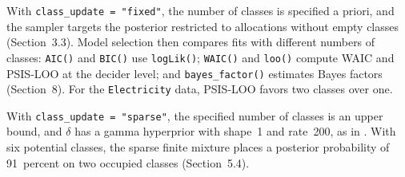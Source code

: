 \documentclass[12pt,a4paper]{article}
\begin{document}
\begin{enumerate}
    With \texttt{class\_update = "fixed"}, the number of classes is specified a
    priori, and the sampler targets the posterior restricted to allocations
    without empty classes (Section~3.3). Model selection then compares fits with
    different numbers of classes: \texttt{AIC()} and \texttt{BIC()} use
    \texttt{logLik()}; \texttt{WAIC()} and \texttt{loo()} compute WAIC and
    PSIS-LOO at the decider level; and \texttt{bayes\_factor()} estimates Bayes
    factors (Section~8). For the \texttt{Electricity} data, PSIS-LOO favors two
    classes over one.

    With \texttt{class\_update = "sparse"}, the specified number of classes is
    an upper bound, and $\delta$ has a gamma hyperprior with shape~1 and
    rate~200, as in \textcite{FruehwirthSchnatter2019}. With six potential
    classes, the sparse finite mixture places a posterior probability of
    91~percent on two occupied classes (Section~5.4).


\end{enumerate}
\end{document}
